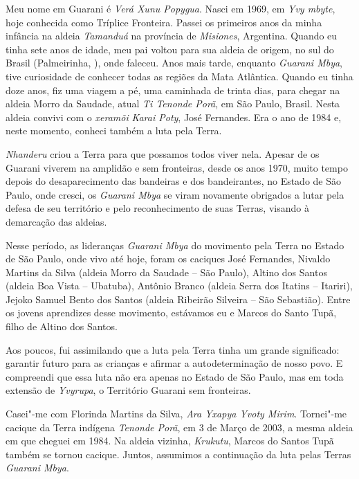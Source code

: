 
 


 


 

Meu nome em Guarani é \emph{Verá Xunu Popygua}. Nasci em 1969, em
\emph{Yvy mbyte}, hoje conhecida como Tríplice Fronteira. Passei os
primeiros anos da minha infância na aldeia \emph{Tamanduá} na província
de \emph{Misiones}, Argentina. Quando eu tinha sete anos de idade, meu
pai voltou para sua aldeia de origem, no sul do Brasil (Palmeirinha,
), onde faleceu. Anos mais tarde, enquanto \emph{Guarani Mbya}, tive
curiosidade de conhecer todas as regiões da Mata Atlântica. Quando eu
tinha doze anos, fiz uma viagem a pé, uma caminhada de trinta dias, para
chegar na aldeia Morro da Saudade, atual \emph{Ti Tenonde Porã}, em São
Paulo, Brasil. Nesta aldeia convivi com o \emph{xeramõi} \emph{Karai
Poty}, José Fernandes. Era o ano de 1984 e, neste momento, conheci
também a luta pela Terra.

\emph{Nhanderu} criou a Terra para que possamos todos viver nela. Apesar
de os Guarani viverem na amplidão e sem fronteiras, desde os anos 1970,
muito tempo depois do desaparecimento das bandeiras e dos bandeirantes,
no Estado de São Paulo, onde cresci, os \emph{Guarani Mbya} se viram
novamente obrigados a lutar pela defesa de seu território e pelo
reconhecimento de suas Terras, visando à demarcação das aldeias.

 

Nesse período, as lideranças \emph{Guarani Mbya} do movimento pela Terra
no Estado de São Paulo, onde vivo até hoje, foram os caciques José
Fernandes, Nivaldo Martins da Silva (aldeia Morro da Saudade -- São
Paulo), Altino dos Santos (aldeia Boa Vista -- Ubatuba), Antônio Branco
(aldeia Serra dos Itatins -- Itariri), Jejoko Samuel Bento dos Santos
(aldeia Ribeirão Silveira -- São Sebastião). Entre os jovens aprendizes
desse movimento, estávamos eu e Marcos do Santo Tupã, filho de Altino
dos Santos.

Aos poucos, fui assimilando que a luta pela Terra tinha um grande
significado: garantir futuro para as crianças e afirmar a
autodeterminação de nosso povo. E compreendi que essa luta não era
apenas no Estado de São Paulo, mas em toda extensão de \emph{Yvyrupa}, o
Território Guarani sem fronteiras.

Casei"-me com Florinda Martins da Silva, \emph{Ara Yxapya Yvoty Mirim}.
Tornei"-me cacique da Terra indígena \emph{Tenonde Porã}, em 3 de Março
de 2003, a mesma aldeia em que cheguei em 1984. Na aldeia vizinha,
\emph{Krukutu}, Marcos do Santos Tupã também se tornou cacique. Juntos,
assumimos a continuação da luta pelas Terras \emph{Guarani Mbya}.

 

 
